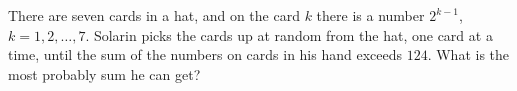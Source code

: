 \documentclass[varwidth]{standalone}
\begin{document}
    There are seven cards in a hat, and on the card $k$ there is a number $2^{k-1}$, $k = 1, 2, \dots, 7$. Solarin picks the cards up at random from the hat, one card at a time, until the sum of the numbers on cards in his hand exceeds $124$. What is the most probably sum he can get?
\end{document}
